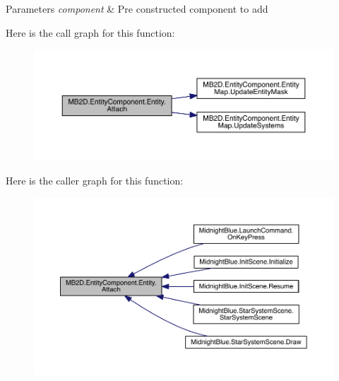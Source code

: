 \begin{DoxyParams}{Parameters}
{\em component} & Pre constructed component to add\\
\hline
\end{DoxyParams}
Here is the call graph for this function\+:\nopagebreak
\begin{figure}[H]
\begin{center}
\leavevmode
\includegraphics[width=350pt]{class_m_b2_d_1_1_entity_component_1_1_entity_aa86d1be62df6d89b981d1000c856a306_cgraph}
\end{center}
\end{figure}
Here is the caller graph for this function\+:\nopagebreak
\begin{figure}[H]
\begin{center}
\leavevmode
\includegraphics[width=350pt]{class_m_b2_d_1_1_entity_component_1_1_entity_aa86d1be62df6d89b981d1000c856a306_icgraph}
\end{center}
\end{figure}
\hypertarget{class_m_b2_d_1_1_entity_component_1_1_entity_a53ffea8d43423903712540fc2df6b82d}{}\label{class_m_b2_d_1_1_entity_component_1_1_entity_a53ffea8d43423903712540fc2df6b82d} 

